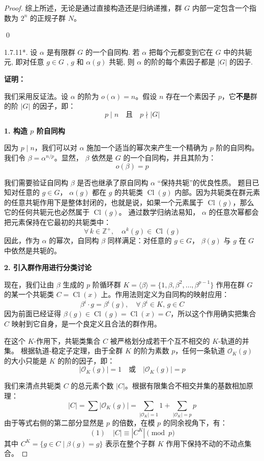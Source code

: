 \documentclass[]{article}
\begin{document}
\begin{proof}
综上所述，无论是通过直接构造还是归纳递推，群 $G$ 内部一定包含一个指数为 $2^n$ 的正规子群 $N$。

\qed

1.7.11*. 设 $\alpha$ 是有限群 $G$ 的一个自同构. 若 $\alpha$ 把每个元都变到它在 $G$ 中的共轭元, 即对任意 $g \in G$ , $g$ 和 $\alpha(g)$ 共轭, 则 $\alpha$ 的阶的每个素因子都是 $|G|$ 的因子. 

\bigskip
\noindent \textbf{证明：} 

我们采用反证法。设 $\alpha$ 的阶为 $o(\alpha) = n$。假设 $n$ 存在一个素因子 $p$，它\textbf{不是}群的阶 $|G|$ 的因子，即：
\[ p \mid n \quad \text{且} \quad p \nmid |G| \]

\bigskip
\noindent \textbf{1. 构造 $p$ 阶自同构}

因为 $p \mid n$，我们可以对 $\alpha$ 施加一个适当的幂次来产生一个精确为 $p$ 阶的自同构。
我们令 $\beta = \alpha^{n/p}$。显然， $\beta$ 依然是 $G$ 的一个自同构，并且其阶为：
\[ o(\beta) = p \]

我们需要验证自同构 $\beta$ 是否也继承了原自同构 $\alpha$ “保持共轭”的优良性质。
题目已知对任意的 $g \in G$， $\alpha(g)$ 都在 $g$ 的共轭类 $\operatorname{Cl}(g)$ 内部。因为共轭类在群元素的任意共轭作用下是整体封闭的，也就是说，如果一个元素属于 $\operatorname{Cl}(g)$，那么它的任何共轭元也必然属于 $\operatorname{Cl}(g)$。
通过数学归纳法易知， $\alpha$ 的任意次幂都会把元素保持在它最初的共轭类中：
\[ \forall \, k \in \mathbb{Z}^+, \quad \alpha^k(g) \in \operatorname{Cl}(g) \]
因此，作为 $\alpha$ 的幂次，自同构 $\beta$ 同样满足：对任意的 $g \in G$， $\beta(g)$ 与 $g$ 在 $G$ 中依然是共轭的。

\bigskip
\noindent \textbf{2. 引入群作用进行分类讨论}

现在，我们让由 $\beta$ 生成的 $p$ 阶循环群 $K = \langle \beta \rangle = \{1, \beta, \beta^2, \dots, \beta^{p-1}\}$ 作用在群 $G$ 的某一个共轭类 $C = \operatorname{Cl}(x)$ 上。作用法则定义为自同构的映射应用：
\[ \beta^i \cdot g = \beta^i(g), \quad \forall \, \beta^i \in K, \, g \in C \]
因为前面已经证得 $\beta(g) \in \operatorname{Cl}(g) = \operatorname{Cl}(x) = C$，所以这个作用确实把集合 $C$ 映射到它自身，是一个良定义且合法的群作用。

在这个 $K$-作用下，共轭类集合 $C$ 被严格划分成若干个互不相交的 $K$-轨道的并集。
根据轨道-稳定子定理，由于全群 $K$ 的阶为素数 $p$，任何一条轨道 $\mathcal{O}_K(g)$ 的大小只能是 $K$ 的阶的因子，即：
\[ |\mathcal{O}_K(g)| = 1 \quad \text{或} \quad |\mathcal{O}_K(g)| = p \]

我们来清点共轭类 $C$ 的总元素个数 $|C|$。根据有限集合不相交并集的基数相加原理：
\[ |C| = \sum |\mathcal{O}_K(g)| = \sum_{|\mathcal{O}_K|=1} 1 + \sum_{|\mathcal{O}_K|=p} p \]
由于等式右侧的第二部分显然是 $p$ 的倍数，在模 $p$ 的同余视角下，有：
\[ (1) \quad |C| \equiv |C^K| \pmod p \]
其中 $C^K = \{ g \in C \mid \beta(g) = g \}$ 表示在整个子群 $K$ 作用下保持不动的不动点集合。


\end{proof}
\end{document}
